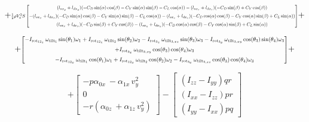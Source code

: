 	    \begin{equation*}
	    	+
            \resizebox{1\textwidth}{!}{$
	    	\frac{1}{2}\rho V_a^2 S 
            \begin{bmatrix} 
                (l_{sx_y}+l_{dx_y})(-C_D \sin(\alpha)\cos(\beta) - C_Y \sin(\alpha) \sin(\beta) - C_L \cos(\alpha)) - (l_{sx_z}+l_{dx_z})(-C_D \sin(\beta) + C_Y \cos(\beta)) \\[6pt]
                -(l_{sx_x}+l_{dx_x})(-C_D \sin(\alpha)\cos(\beta) - C_Y \sin(\alpha) \sin(\beta) - C_L \cos(\alpha)) - (l_{sx_z}+l_{dx_z})(-C_D \cos(\alpha)\cos(\beta) - C_Y \cos(\alpha) \sin(\beta) + C_L \sin(\alpha)) \\[6pt]
                (l_{sx_x}+l_{dx_x})(-C_D \sin(\beta) + C_Y \cos(\beta)) - (l_{sx_y}+l_{dx_y})(-C_D \cos(\alpha)\cos(\beta) - C_Y \cos(\alpha) \sin(\beta) + C_L \sin(\alpha))
            \end{bmatrix} 
            $}
	    	+
	    \end{equation*}
	    
	     \begin{equation*}
	    	+
	    	 \resizebox{0.93\textwidth}{!}{$
	    		\begin{bmatrix}
	    			-I_{\text{rot}_{12_{z}}}\,\omega_{\text{tilt}_{1}} \sin(\theta_{1}) \omega_{1}
	    			+ I_{\text{rot}_{12_{z}}}\,\omega_{\text{tilt}_{2}} \sin(\theta_{2})\omega_{2}
	    			- I_{\text{rot}_{3_{z}}}\,\omega_{\text{tilt}_{3,xz}} \sin(\theta_{3}) \omega_{3}
	    			- I_{\text{rot}_{3_{y}}}\,\omega_{\text{tilt}_{3,xy}} \cos(\theta_{3}) \sin(\theta_{4}) \omega_{3} \\[6pt]
	    			+ I_{\text{rot}_{3_{x}}}\,\omega_{\text{tilt}_{3,xy}} \cos(\theta_{3}) \cos(\theta_{4})\omega_{3} \\[6pt]
	    			-I_{\text{rot}_{12_{x}}}\,\omega_{\text{tilt}_{1}} \cos(\theta_{1}) \omega_{1}
	    			+ I_{\text{rot}_{12_{x}}}\,\omega_{\text{tilt}_{2}} \cos(\theta_{2}) \omega_{2}
	    			- I_{\text{rot}_{3_{x}}}\,\omega_{\text{tilt}_{3,xz}} \cos(\theta_{3}) \cos(\theta_{4}) \omega_{3}
	    		\end{bmatrix}
	    		$}
	    	+
	    \end{equation*}
	    
	    \begin{equation}
	    	+
	    	\begin{bmatrix}
	    		-p\alpha_{0x}\ - \alpha_{1x}\,v_y^2 \\
	    		0 \\
	    		-r\left( \alpha_{0z}\ + \alpha_{1z}\,v_y^2 \right)
	    	\end{bmatrix}
	    	- \begin{bmatrix}
	    		(I_{zz}-I_{yy})	qr \\
	    		(I_{xx}-I_{zz})	pr\\
	    		(I_{yy}-I_{xx})	pq
	    	\end{bmatrix}
            \label{eq:matrix_M_tot}
	    \end{equation}
\clearpage
